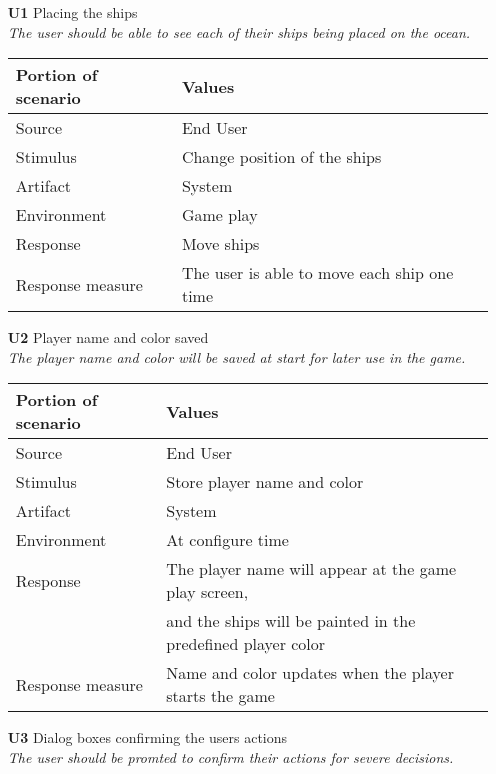     \begin{itemize}
        \item[\textbf{U1}] Placing the ships \\
        \textit{\small{The user should be able to see each of their ships being placed on the ocean.}}
        
        \begin{tabular}{| l | l |}
            \hline
            \rowcolor[gray]{0.8}
            \textbf{Portion of scenario} & \textbf{Values} \\
            \hline
            Source & End User \\
            Stimulus & Change position of the ships \\
            Artifact & System \\
            Environment & Game play \\
            Response & Move ships  \\
            Response measure & The user is able to move each ship one time \\
            \hline
        \end{tabular}

        \item[\textbf{U2}] Player name and color saved \\
        \textit{\small{The player name and color will be saved at start for later use in the game.}}
        
        \begin{tabular}{| l | l |}
            \hline
            \rowcolor[gray]{0.8}
            \textbf{Portion of scenario} & \textbf{Values} \\
            \hline
            Source & End User \\
            Stimulus & Store player name and color \\
            Artifact & System \\
            Environment & At configure time \\
            Response & The player name will appear at the game play screen, \\
             & and the ships will be painted in the predefined player color  \\
            Response measure & Name and color updates when the player starts the game \\
            \hline
        \end{tabular}

        \item[\textbf{U3}] Dialog boxes confirming the users actions \\
        \textit{\small{The user should be promted to confirm their actions for severe decisions.}}
        

\end{itemize}
